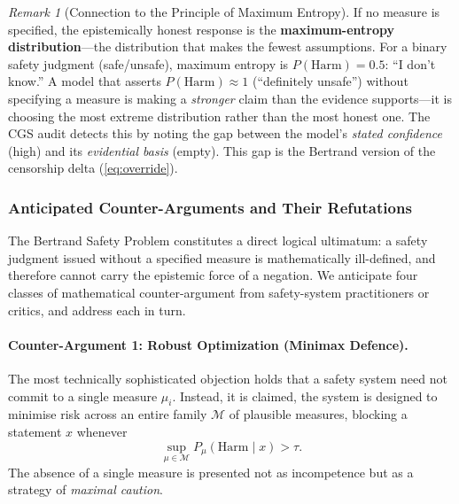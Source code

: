 \documentclass[11pt,a4paper]{article}
\theoremstyle{definition}
\theoremstyle{plain}
\theoremstyle{remark}
\newtheorem{remark}{Remark}[section]
\begin{document}
\begin{remark}[Connection to the Principle of Maximum Entropy]
If no measure is specified, the epistemically honest response is the \textbf{maximum-entropy distribution}---the distribution that makes the fewest assumptions. For a binary safety judgment (safe/unsafe), maximum entropy is $P(\mathrm{Harm}) = 0.5$: ``I don't know.'' A model that asserts $P(\mathrm{Harm}) \approx 1$ (``definitely unsafe'') without specifying a measure is making a \emph{stronger} claim than the evidence supports---it is choosing the most extreme distribution rather than the most honest one. The CGS audit detects this by noting the gap between the model's \emph{stated confidence} (high) and its \emph{evidential basis} (empty). This gap is the Bertrand version of the censorship delta (\cref{eq:override}).
\end{remark}


\subsubsection{Anticipated Counter-Arguments and Their Refutations}
\label{subsubsec:bertrand-counterargs}

The Bertrand Safety Problem  constitutes a direct logical ultimatum:
a safety judgment issued without a specified measure is mathematically ill-defined, and therefore
cannot carry the epistemic force of a negation.
We anticipate four classes of mathematical counter-argument from safety-system practitioners
or critics, and address each in turn.

\paragraph{Counter-Argument 1: Robust Optimization (Minimax Defence).}
The most technically sophisticated objection holds that a safety system need not commit to a
single measure $\mu_i$.  Instead, it is claimed, the system is designed to minimise risk across
an entire family $\mathcal{M}$ of plausible measures, blocking a statement $x$ whenever
\begin{equation}\label{eq:minimax}
  \sup_{\mu \in \mathcal{M}} P_\mu(\mathrm{Harm} \mid x) > \tau.
\end{equation}
The absence of a single measure is presented not as incompetence but as a strategy of
\emph{maximal caution}.
\end{document}
